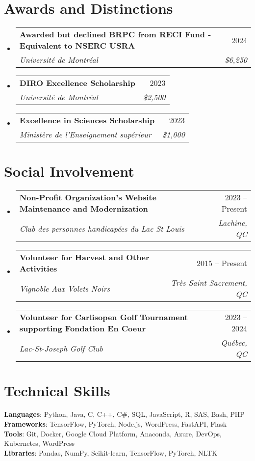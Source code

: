 \documentclass[letterpaper,11pt]{article}
\makeatletter
\newcommand{\resumeSubheading}[4]{
  \vspace{-2pt}\item
    \begin{tabular*}{0.97\textwidth}[t]{l@{\extracolsep{\fill}}r}
      \textbf{#1} & #2 \\
      \textit{\small#3} & \textit{\small #4} \\
    \end{tabular*}\vspace{-7pt}
}
\newcommand{\resumeSubHeadingListStart}{\begin{itemize}[leftmargin=0.15in, label={}]}
\newcommand{\resumeSubHeadingListEnd}{\end{itemize}}
\makeatother
\begin{document}
\section{Awards and Distinctions}
    \resumeSubHeadingListStart
      \resumeSubheading
          {Awarded but declined BRPC from RECI Fund - Equivalent to NSERC USRA}{2024}
          {Université de Montréal}{\$6,250}
      \resumeSubheading
          {DIRO Excellence Scholarship}{2023}
          {Université de Montréal}{\$2,500}
      \resumeSubheading
          {Excellence in Sciences Scholarship}{2023}
          {Ministère de l'Enseignement supérieur}{\$1,000}
    \resumeSubHeadingListEnd


\section{Social Involvement}
    \resumeSubHeadingListStart
      \resumeSubheading
          {Non-Profit Organization's Website Maintenance and Modernization}{2023 -- Present}
          {Club des personnes handicapées du Lac St-Louis}{Lachine, QC}
      \resumeSubheading
          {Volunteer for Harvest and Other Activities}{2015 -- Present}
          {Vignoble Aux Volets Noirs}{Très-Saint-Sacrement, QC}
      \resumeSubheading
          {Volunteer for Carlisopen Golf Tournament supporting Fondation En Coeur}{2023 -- 2024}
          {Lac-St-Joseph Golf Club}{Québec, QC}
    \resumeSubHeadingListEnd


%
\section{Technical Skills}
 \begin{itemize}[leftmargin=0.15in, label={}]
    \small{\item{
     \textbf{Languages}{: Python, Java, C, C++, C\#, SQL, JavaScript, R, SAS, Bash, PHP} \\
     \textbf{Frameworks}{: TensorFlow, PyTorch, Node.js, WordPress, FastAPI, Flask} \\
     \textbf{Tools}{: Git, Docker, Google Cloud Platform, Anaconda, Azure, DevOps, Kubernetes, WordPress} \\
     \textbf{Libraries}{: Pandas, NumPy, Scikit-learn, TensorFlow, PyTorch, NLTK}
    }}
 \end{itemize}


\end{document}
